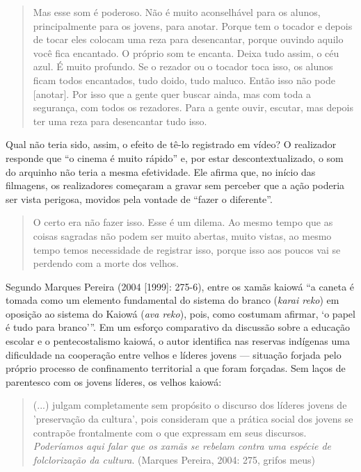 \begin{quote}
Mas esse som é poderoso. Não é muito aconselhável para os alunos,
principalmente para os jovens, para anotar. Porque tem o tocador e
depois de tocar eles colocam uma reza para desencantar, porque ouvindo
aquilo você fica encantado. O próprio som te encanta. Deixa tudo assim,
o céu azul. É muito profundo. Se o rezador ou o tocador toca isso, os
alunos ficam todos encantados, tudo doido, tudo maluco. Então isso não
pode {[}anotar{]}. Por isso que a gente quer buscar ainda, mas com toda
a segurança, com todos os rezadores. Para a gente ouvir, escutar, mas
depois ter uma reza para desencantar tudo isso.
\end{quote}

Qual não teria sido, assim, o efeito de tê-lo registrado em vídeo? O
realizador responde que ``o cinema é muito rápido'' e, por estar
descontextualizado, o som do arquinho não teria a mesma efetividade. Ele
afirma que, no início das filmagens, os realizadores começaram a gravar
sem perceber que a ação poderia ser vista perigosa, movidos pela vontade
de ``fazer o diferente''.

\begin{quote}
O certo era não fazer isso. Esse é um dilema. Ao mesmo tempo que as
coisas sagradas não podem ser muito abertas, muito vistas, ao mesmo
tempo temos necessidade de registrar isso, porque isso aos poucos vai se
perdendo com a morte dos velhos.
\end{quote}

Segundo Marques Pereira (2004 {[}1999{]}: 275-6), entre os xamãs kaiowá
``a caneta é tomada como um elemento fundamental do sistema do branco
(\emph{karai reko}) em oposição ao sistema do Kaiowá (\emph{ava reko}),
pois, como costumam afirmar, `o papel é tudo para branco'''. Em um
esforço comparativo da discussão sobre a educação escolar e o
pentecostalismo kaiowá, o autor identifica nas reservas indígenas uma
dificuldade na cooperação entre velhos e líderes jovens --- situação
forjada pelo próprio processo de confinamento territorial a que foram
forçadas. Sem laços de parentesco com os jovens líderes, os velhos
kaiowá:

\begin{quote}
(...) julgam completamente sem propósito o discurso dos líderes jovens
de 'preservação da cultura', pois consideram que a prática social dos
jovens se contrapõe frontalmente com o que expressam em seus discursos.
\emph{Poderíamos aqui falar que os xamãs se rebelam contra uma espécie
de folclorização da cultura}. (Marques Pereira, 2004: 275, grifos meus)
\end{quote}

